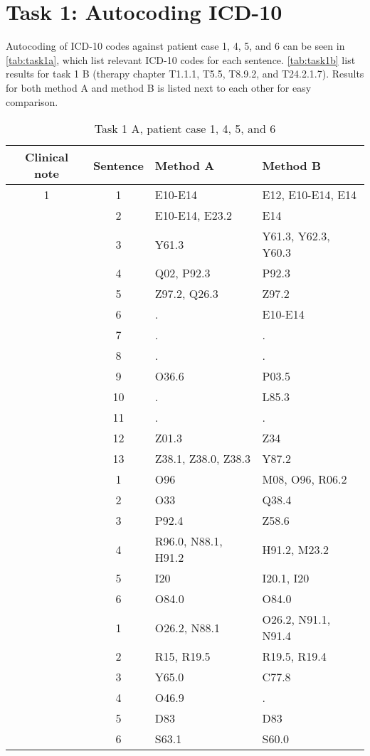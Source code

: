 \section{Task 1: Autocoding ICD-10}
Autocoding of ICD-10 codes against patient case 1, 4, 5, and 6 can be seen in
\autoref{tab:task1a}, which list relevant ICD-10 codes for each sentence.
\autoref{tab:task1b} list results for task 1 B (therapy chapter T1.1.1, T5.5,
T8.9.2, and T24.2.1.7). Results for both method A and method B is listed next
to each other for easy comparison.
\begin{table}[htbp] \footnotesize \center
\caption{Task 1 A, patient case 1, 4, 5, and 6\label{tab:task1a}}
\begin{tabular}{c c l l}
    \toprule
    Clinical note & Sentence & Method A & Method B \\
    \midrule
	1 & 1 & E10-E14 & E12, E10-E14, E14 \\
	 & 2 & E10-E14, E23.2 & E14 \\
	 & 3 & Y61.3 & Y61.3, Y62.3, Y60.3 \\
	 & 4 & Q02, P92.3 & P92.3 \\
	 & 5 & Z97.2, Q26.3 & Z97.2 \\
	 & 6 & . & E10-E14 \\
	 & 7 & . & . \\
	 & 8 & . & . \\
	 & 9 & O36.6 & P03.5 \\
	 & 10 & . & L85.3 \\
	 & 11 & . & . \\
	 & 12 & Z01.3 & Z34 \\
	 & 13 & Z38.1, Z38.0, Z38.3 & Y87.2 \\
	\addlinespace
	4 & 1 & O96 & M08, O96, R06.2 \\
	 & 2 & O33 & Q38.4 \\
	 & 3 & P92.4 & Z58.6 \\
	 & 4 & R96.0, N88.1, H91.2 & H91.2, M23.2 \\
	 & 5 & I20 & I20.1, I20 \\
	 & 6 & O84.0 & O84.0 \\
	\addlinespace
	5 & 1 & O26.2, N88.1 & O26.2, N91.1, N91.4 \\
	 & 2 & R15, R19.5 & R19.5, R19.4 \\
	 & 3 & Y65.0 & C77.8 \\
	 & 4 & O46.9 & . \\
	 & 5 & D83 & D83 \\
	 & 6 & S63.1 & S60.0 \\

\end{tabular}
\end{table}
